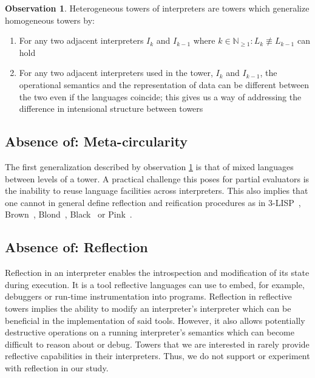 \documentclass[sigplan,anonymous,review]{acmart}
\theoremstyle{definition}
\newtheorem{observation}{Observation}[section]
\begin{document}
\begin{observation}
    \label{def:het}
	Heterogeneous towers of interpreters are towers which generalize homogeneous towers by:
	\begin{enumerate}
		\item For any two adjacent interpreters $I_k$ and $I_{k-1}$ where $k \in \mathbb N_{\ge 1}: L_k \not\equiv L_{k-1}$ can hold
		\item For any two adjacent interpreters used in the tower, $I_{k}$ and $I_{k-1}$, the operational semantics and the representation of data can be different between the two even if the languages coincide; this gives us a way of addressing the difference in intensional structure between towers
	\end{enumerate}
\end{observation}

\subsection{Absence of: Meta-circularity}
The first generalization described by observation \ref{def:het} is that of mixed languages between levels of a tower. A practical challenge this poses for partial evaluators is the inability to reuse language facilities across interpreters. This also implies that one cannot in general define reflection and reification procedures as in 3-LISP~\cite{smith1984reflection}, Brown~\cite{wand1988mystery}, Blond~\cite{danvy1988intensions}, Black~\cite{asai1996duplication} or Pink~\cite{amin2017collapsing}.

\subsection{Absence of: Reflection}
Reflection in an interpreter enables the introspection and modification of its state during execution. It is a tool reflective languages can use to embed, for example, debuggers or run-time instrumentation into programs. Reflection in reflective towers implies the ability to modify an interpreter's interpreter which can be beneficial in the implementation of said tools. However, it also allows potentially destructive operations on a running interpreter's semantics which can become difficult to reason about or debug. Towers that we are interested in rarely provide reflective capabilities in their interpreters. Thus, we do not support or experiment with reflection in our study.
\end{document}
